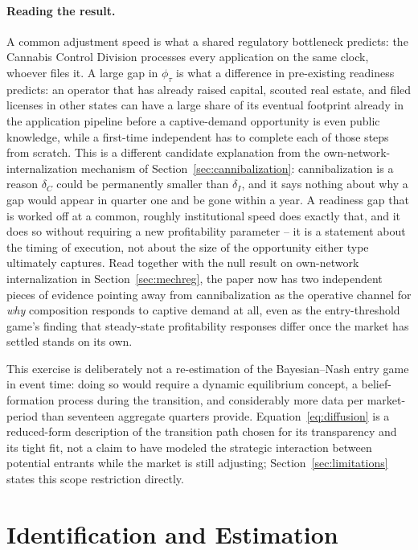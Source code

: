 \documentclass[english,12pt]{article}
\begin{document}
\paragraph{Reading the result.} A common adjustment speed is what a shared regulatory bottleneck predicts: the Cannabis Control Division processes every application on the same clock, whoever files it. A large gap in $\phi_\tau$ is what a difference in pre-existing readiness predicts: an operator that has already raised capital, scouted real estate, and filed licenses in other states can have a large share of its eventual footprint already in the application pipeline before a captive-demand opportunity is even public knowledge, while a first-time independent has to complete each of those steps from scratch. This is a different candidate explanation from the own-network-internalization mechanism of Section~\ref{sec:cannibalization}: cannibalization is a reason $\delta_C$ could be permanently smaller than $\delta_I$, and it says nothing about why a gap would appear in quarter one and be gone within a year. A readiness gap that is worked off at a common, roughly institutional speed does exactly that, and it does so without requiring a new profitability parameter -- it is a statement about the timing of execution, not about the size of the opportunity either type ultimately captures. Read together with the null result on own-network internalization in Section~\ref{sec:mechreg}, the paper now has two independent pieces of evidence pointing away from cannibalization as the operative channel for \emph{why} composition responds to captive demand at all, even as the entry-threshold game's finding that steady-state profitability responses differ once the market has settled stands on its own.

This exercise is deliberately not a re-estimation of the Bayesian--Nash entry game in event time: doing so would require a dynamic equilibrium concept, a belief-formation process during the transition, and considerably more data per market-period than seventeen aggregate quarters provide. Equation~\eqref{eq:diffusion} is a reduced-form description of the transition path chosen for its transparency and its tight fit, not a claim to have modeled the strategic interaction between potential entrants while the market is still adjusting; Section~\ref{sec:limitations} states this scope restriction directly.

\FloatBarrier

\section{Identification and Estimation}
\label{sec:identification}
\end{document}
